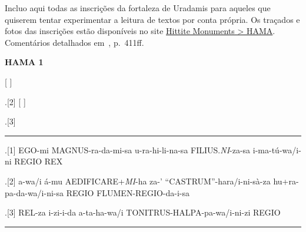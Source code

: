 
Incluo aqui todas as inscrições da fortaleza de Uradamis para aqueles que
quiserem tentar experimentar a leitura de textos por conta própria.
Os traçados e fotos das inscrições estão disponíveis no site
\href{https://www.hittitemonuments.com/hama/}{Hittite Monuments > HAMA}.
Comentários detalhados em~, p.\ 411ff.


\begin{flushleft}

\noindent \textbf{HAMA 1}

\begin{parnumbers}
\large {}\hspace{5pt}
\hspace{5pt}
\hspace{5pt}
\hspace{5pt}
[\hspace{5pt}
 ]
	 
\end{parnumbers}

\ex.[2] \large [\hspace{5pt}
\hspace{5pt}
\hspace{5pt}
]\hspace{5pt}
\hspace{5pt}
\hspace{5pt}

\ex.[3] \large {} \hspace{5pt}
\hspace{5pt}
\hspace{5pt}


\hrule

	\ex.[1]  {EGO-mi}
{MAGNUS-ra-da-mi-sa}
{u-ra-hi-li-na-sa}
{FILIUS.\emph{NI}-za-sa}
{i-ma-tú-wa/i-ni}
{REGIO}
{REX}

\ex.[2]  {a-wa/i} {á-mu} {AEDIFICARE+\emph{MI}-ha} {za-'} {``CASTRUM''-hara/i-ni-sà-za}
{hu+ra-pa-da-wa/i-ni-sa REGIO}
{FLUMEN-REGIO-da-i-sa}

\ex.[3]  {REL-za i-zi-i-da}
{a-ta-ha-wa/i}
{TONITRUS-HALPA-pa-wa/i-ni-zi REGIO}


\hrule


\end{flushleft}
